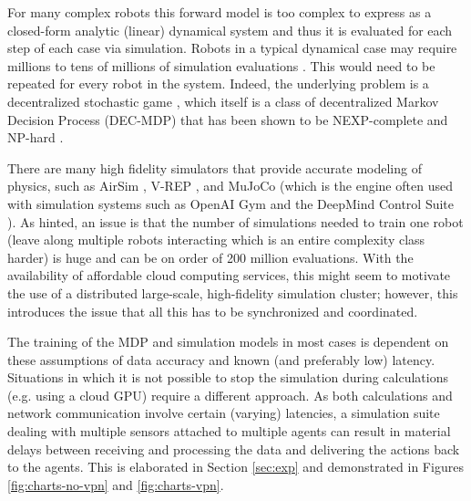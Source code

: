 \documentclass{article}
\let\cite\citep
\begin{document}
For many complex robots this forward model is too complex to express as a closed-form analytic (linear) dynamical system and thus it is evaluated for each step of each case via simulation.  Robots in a typical dynamical case may require millions to tens of millions of simulation evaluations \cite{SAC}.   This would need to be repeated for every robot in the system.   Indeed, the underlying problem is a decentralized stochastic game \cite{redulla2018simulating}, which itself is a class of decentralized Markov Decision Process (DEC-MDP) that has been shown to be NEXP-complete and NP-hard \cite{papadimitriou1986intractable, bernstein2002complexity}.

There are many high fidelity simulators that provide accurate modeling of physics, such as AirSim \cite{shah2018airsim}, V-REP \cite{rohmer2013v}, and MuJoCo \cite{Todorov2012MuJoCo} (which is the engine often used with simulation systems such as OpenAI Gym \cite{Brockman2016Gym} and the DeepMind Control Suite \cite{Tassa2018DMC}).  As hinted, an issue is that the number of simulations needed to train one robot (leave along multiple robots interacting which is an entire complexity class harder) is huge and can be on order of 200 million evaluations.  With the availability of affordable cloud computing services, this might seem to motivate the use of a distributed large-scale, high-fidelity simulation cluster; however, this introduces the issue that all this has to be synchronized and coordinated.

The training of the MDP and simulation models in most cases is dependent on these assumptions of data accuracy and known (and preferably low) latency.  Situations in which it is not possible to stop the simulation during calculations (e.g. using a cloud GPU) require a different approach. %
As both calculations and network communication involve certain (varying) latencies, a simulation suite dealing with multiple sensors attached to multiple agents can result in material delays between receiving and processing the data and delivering the actions back to the agents.   This is elaborated in Section \ref{sec:exp} and demonstrated in Figures \ref{fig:charts-no-vpn} and \ref{fig:charts-vpn}.

\end{document}
